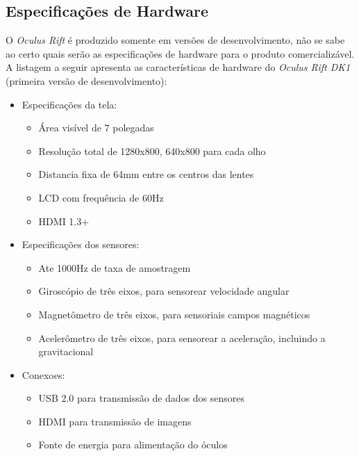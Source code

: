 \subsection{Especificações de Hardware}
O \textit{Oculus Rift} é produzido somente em versões de desenvolvimento, não se sabe ao certo quais serão as especificações de hardware para o produto comercializável. A listagem a seguir apresenta as características de hardware do \textit{Oculus Rift DK1} (primeira versão de desenvolvimento):
\begin{itemize}
	\item Especificações da tela:
		\begin{itemize}
			\item Área visível de 7 polegadas
			\item Resolução total de 1280x800, 640x800 para cada olho
			\item Distancia fixa de 64mm entre os centros das lentes
			\item LCD com frequência de 60Hz
			\item HDMI 1.3+
		\end{itemize}
	\item Especificações dos sensores:
		\begin{itemize}
			\item Ate 1000Hz de taxa de amostragem
			\item Giroscópio de três eixos, para sensorear velocidade angular
			\item Magnetômetro de três eixos, para sensoriais campos magnéticos
			\item Acelerômetro de três eixos, para sensorear a aceleração, incluindo a gravitacional
		\end{itemize}
	\item Conexoes:
		\begin{itemize}
			\item USB 2.0 para transmissão de dados dos sensores
			\item HDMI para transmissão de imagens
			\item Fonte de energia para alimentação do óculos
		\end{itemize}
\end{itemize}

